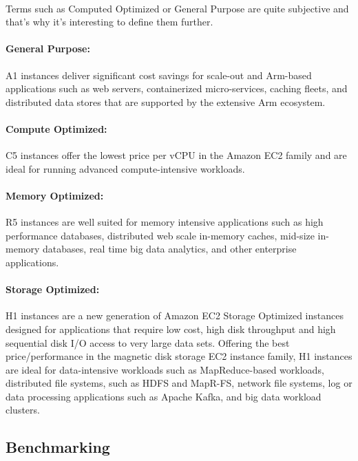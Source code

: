 \documentclass[11pt]{article}
\begin{document}
		\paragraph{} Terms such as Computed Optimized or General Purpose are quite subjective and that's why it's interesting to define them further. \cite{9}\cite{10}\cite{11}\cite{12}

		\paragraph{General Purpose:} A1 instances deliver significant cost
		savings for scale-out and Arm-based applications such as web servers,
		containerized micro-services, caching fleets, and distributed data stores
		that are supported by the extensive Arm ecosystem. 

		\paragraph{Compute Optimized:} C5 instances offer the lowest price per
		vCPU in the Amazon EC2 family and are ideal for running advanced
		compute-intensive workloads.

		\paragraph{Memory Optimized:} R5 instances are well suited for memory
		intensive applications such as high performance databases, distributed
		web scale in-memory caches, mid-size in-memory databases, real time big
		data analytics, and other enterprise applications.

		\paragraph{Storage Optimized:} H1 instances are a new generation of
		Amazon EC2 Storage Optimized instances designed for applications that
		require low cost, high disk throughput and high sequential disk I/O
		access to very large data sets. Offering the best price/performance in
		the magnetic disk storage EC2 instance family, H1 instances are ideal
		for data-intensive workloads such as MapReduce-based workloads,
		distributed file systems, such as HDFS and MapR-FS, network file
		systems, log or data processing applications such as Apache Kafka, and
		big data workload clusters.

	\subsection{Benchmarking}
\end{document}

